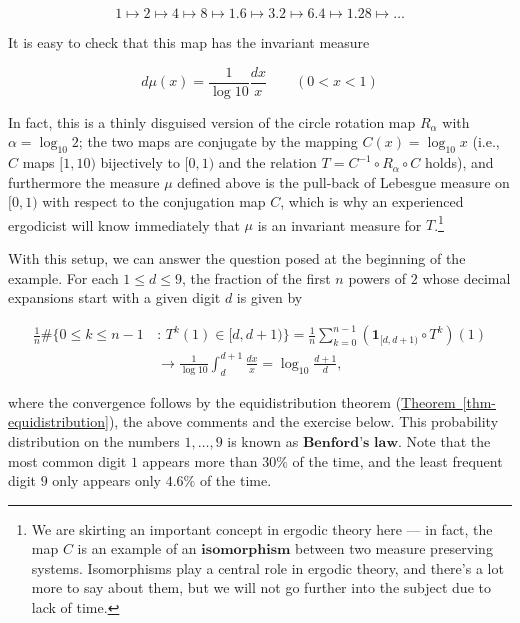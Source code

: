 \documentclass[11pt]{report}
\theoremstyle{plain}
\theoremstyle{definition}
\begin{document}
\begin{enumerate}[label=\arabic*.]
\[
1 \mapsto 2 \mapsto 4 \mapsto 8 \mapsto 1.6 \mapsto 3.2 \mapsto 6.4 \mapsto 1.28 \mapsto \ldots
\]

\noindent It is easy to check that this map has the invariant
measure

\[
d\mu(x) = \frac{1}{\log 10} \frac{dx}{x} \qquad (0<x<1)
\]

\noindent In fact, this is a thinly disguised version of the
circle rotation map $R_\alpha$ with
$\alpha=\log_{10} 2$; the two maps are conjugate by
the mapping $C(x) = \log_{10} x$ (i.e., $C$ maps
$[1,10)$ bijectively to $[0,1)$ and the relation
$T = C^{-1} \circ R_\alpha\circ C$ holds), and
furthermore the measure $\mu$ defined above is the
pull-back of Lebesgue measure on $[0,1)$ with respect
to the conjugation map $C$, which is why an
experienced ergodicist will know immediately that
$\mu$ is an invariant measure for
$T$.\footnote{We are skirting an important concept in ergodic
theory here --- in fact, the map $C$ is an example of
an $\textbf{isomorphism}$ between two measure
preserving systems. Isomorphisms play a central role
in ergodic theory, and there's a lot more to say about
them, but we will not go further into the subject due
to lack of time.}

With this setup, we can answer the question posed at
the beginning of the example. For each $1\le d\le 9$,
the fraction of the first $n$ powers of $2$ whose
decimal expansions start with a given digit $d$ is
given by

\begin{align*}
\frac{1}{n} \#\{ 0\le k\le n-1\,&:\, T^k(1) \in [d,d+1) \} =
\frac{1}{n} \sum_{k=0}^{n-1} \left(\mathbf{1}_{[d,d+1)}\circ T^k\right)(1) \\ &\to \frac{1}{\log 10}\int_d^{d+1}\frac{dx}{x}
= \log_{10}\frac{d+1}{d},
\end{align*}

\noindent where the convergence follows by the equidistribution
theorem (\hyperref[thm-equidistribution]{Theorem~\ref*{thm-equidistribution}}), the above
comments and the exercise below. This probability
distribution on the numbers $1,\ldots,9$ is known as
$\textbf{Benford's law}$. Note that the most common
digit $1$ appears more than $30\%$ of the time, and
the least frequent digit $9$ only appears only $4.6\%$
of the time.


\end{enumerate}
\end{document}
